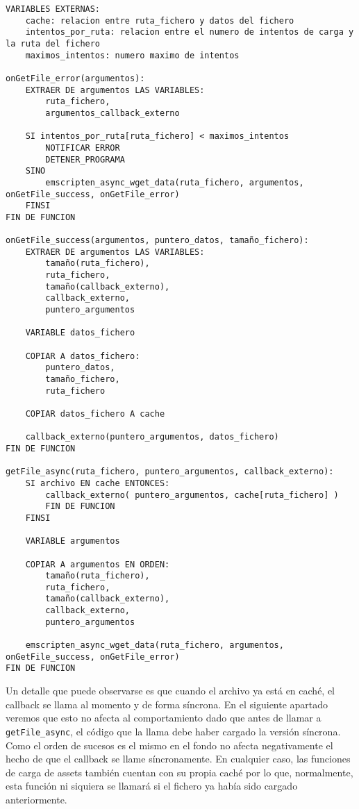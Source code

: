 \begin{lstlisting}
VARIABLES EXTERNAS:
    cache: relacion entre ruta_fichero y datos del fichero
    intentos_por_ruta: relacion entre el numero de intentos de carga y la ruta del fichero
    maximos_intentos: numero maximo de intentos

onGetFile_error(argumentos):
    EXTRAER DE argumentos LAS VARIABLES:
        ruta_fichero,
        argumentos_callback_externo
        
    SI intentos_por_ruta[ruta_fichero] < maximos_intentos
        NOTIFICAR ERROR
        DETENER_PROGRAMA
    SINO
        emscripten_async_wget_data(ruta_fichero, argumentos, onGetFile_success, onGetFile_error)
    FINSI
FIN DE FUNCION

onGetFile_success(argumentos, puntero_datos, tamaño_fichero):
    EXTRAER DE argumentos LAS VARIABLES:
        tamaño(ruta_fichero),
        ruta_fichero,
        tamaño(callback_externo),
        callback_externo,
        puntero_argumentos
        
    VARIABLE datos_fichero
    
    COPIAR A datos_fichero:
        puntero_datos,
        tamaño_fichero,
        ruta_fichero
        
    COPIAR datos_fichero A cache
    
    callback_externo(puntero_argumentos, datos_fichero)
FIN DE FUNCION

getFile_async(ruta_fichero, puntero_argumentos, callback_externo):
    SI archivo EN cache ENTONCES:
        callback_externo( puntero_argumentos, cache[ruta_fichero] )
        FIN DE FUNCION
    FINSI
    
    VARIABLE argumentos
    
    COPIAR A argumentos EN ORDEN: 
        tamaño(ruta_fichero), 
        ruta_fichero, 
        tamaño(callback_externo), 
        callback_externo,
        puntero_argumentos

	emscripten_async_wget_data(ruta_fichero, argumentos, onGetFile_success, onGetFile_error)
FIN DE FUNCION
\end{lstlisting}

Un detalle que puede observarse es que cuando el archivo ya está en caché, el callback se llama al momento y de forma síncrona. En el siguiente apartado veremos que esto no afecta al comportamiento dado que antes de llamar a \texttt{getFile\_async}, el código que la llama debe haber cargado la versión síncrona. Como el orden de sucesos es el mismo en el fondo no afecta negativamente el hecho de que el callback se llame síncronamente. En cualquier caso, las funciones de carga de assets también cuentan con su propia caché por lo que, normalmente, esta función ni siquiera se llamará si el fichero ya había sido cargado anteriormente.

